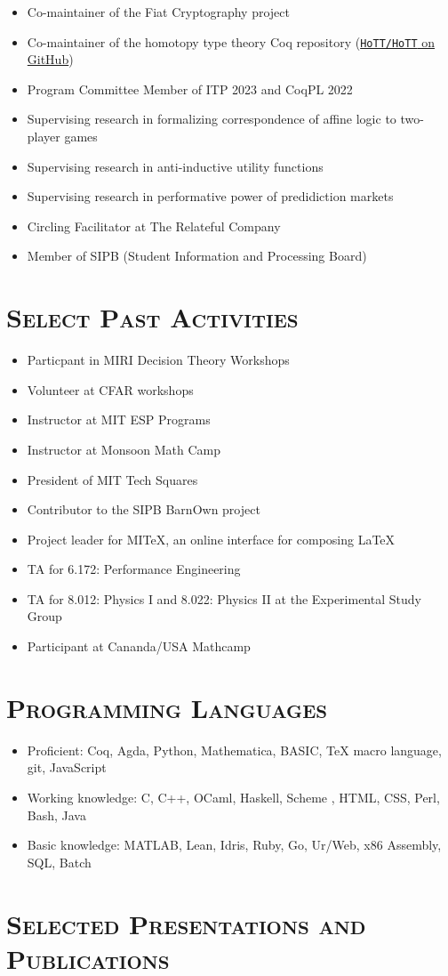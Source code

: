 \documentclass[11pt]{res}
\begin{document}
\begin{itemize}
\item Co-maintainer of the Fiat Cryptography project
\item Co-maintainer of the homotopy type theory Coq repository (\href{https://github.com/HoTT/HoTT}{\texttt{HoTT/HoTT} on GitHub})
\item Program Committee Member of ITP 2023 and CoqPL 2022
\item Supervising research in formalizing correspondence of affine logic to two-player games
\item Supervising research in anti-inductive utility functions
\item Supervising research in performative power of predidiction markets
\item Circling Facilitator at The Relateful Company
\item Member of SIPB (Student Information and Processing Board)
\end{itemize}

\section{\textsc{Select Past Activities}}

\begin{itemize}
\item Particpant in MIRI Decision Theory Workshops
\item Volunteer at CFAR workshops
\item Instructor at MIT ESP Programs
\item Instructor at Monsoon Math Camp
\item President of MIT Tech Squares
\item Contributor to the SIPB BarnOwn project
\item Project leader for MITeX, an online interface for composing \LaTeX
\item TA for 6.172: Performance Engineering
\item TA for 8.012: Physics I and 8.022: Physics II at the Experimental Study Group
\item Participant at Cananda/USA Mathcamp
\end{itemize}

\section{\textsc{Programming Languages}}
\begin{itemize}
\item
  Proficient: Coq, Agda, Python, %
  Mathematica, BASIC, \TeX{} macro language, git, JavaScript
\item
  Working knowledge: %
  C, C++, OCaml, Haskell, Scheme%
  , HTML, CSS, Perl, Bash, Java
\item
  Basic knowledge: MATLAB, Lean, Idris, Ruby, Go, Ur/Web, x86 Assembly, SQL, Batch
\end{itemize}

\nocite{*}

\clearpage
\section{\textsc{Selected Presentations and Publications}}
\printbibliography[title={\ensuremath{\left.\right.}},notcategory=exclude]

\endresume
\end{document}
